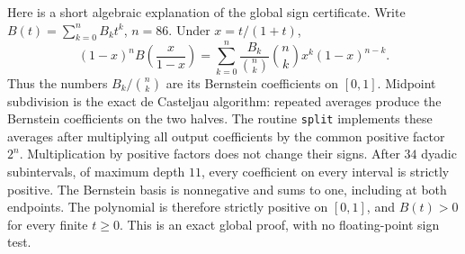 \documentclass[11pt,a4paper]{article}
\theoremstyle{definition}
\theoremstyle{remark}
\numberwithin{equation}{section}
\begin{document}
Here is a short algebraic explanation of the global sign certificate.
Write $B(t)=\sum_{k=0}^{n}B_k t^k$, $n=86$. Under $x=t/(1+t)$,
\[
 (1-x)^nB\!\left(\frac{x}{1-x}\right)
 =\sum_{k=0}^n\frac{B_k}{\binom nk}
               \binom nk x^k(1-x)^{n-k}.
\]
Thus the numbers $B_k/\binom nk$ are its Bernstein coefficients on
$[0,1]$. Midpoint subdivision is the exact de Casteljau algorithm:
repeated averages produce the Bernstein coefficients on the two halves.
The routine \texttt{split} implements these averages after multiplying
all output coefficients by the common positive factor $2^n$.
Multiplication by positive factors does not change their signs.
After $34$ dyadic subintervals, of maximum depth $11$, every coefficient
on every interval is strictly positive. The Bernstein basis is
nonnegative and sums to one, including at both endpoints. The polynomial
is therefore strictly positive on $[0,1]$, and $B(t)>0$ for every finite
$t\geq0$. This is an exact global proof, with no floating-point sign test.
\end{document}
